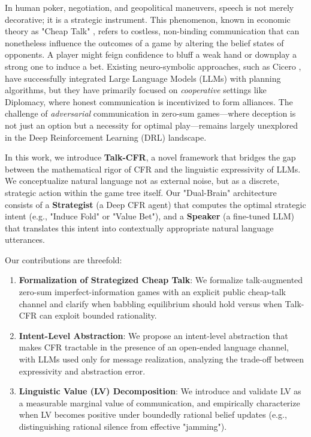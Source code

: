 \documentclass{article}
\begin{document}
In human poker, negotiation, and geopolitical maneuvers, speech is not merely decorative; it is a strategic instrument. This phenomenon, known in economic theory as "Cheap Talk" \citep{crawford1982strategic}, refers to costless, non-binding communication that can nonetheless influence the outcomes of a game by altering the belief states of opponents. A player might feign confidence to bluff a weak hand or downplay a strong one to induce a bet. Existing neuro-symbolic approaches, such as Cicero \citep{bakhtin2022mastering}, have successfully integrated Large Language Models (LLMs) with planning algorithms, but they have primarily focused on \textit{cooperative} settings like Diplomacy, where honest communication is incentivized to form alliances. The challenge of \textit{adversarial} communication in zero-sum games—where deception is not just an option but a necessity for optimal play—remains largely unexplored in the Deep Reinforcement Learning (DRL) landscape.

In this work, we introduce \textbf{Talk-CFR}, a novel framework that bridges the gap between the mathematical rigor of CFR and the linguistic expressivity of LLMs. We conceptualize natural language not as external noise, but as a discrete, strategic action within the game tree itself. Our "Dual-Brain" architecture consists of a \textbf{Strategist} (a Deep CFR agent) that computes the optimal strategic intent (e.g., "Induce Fold" or "Value Bet"), and a \textbf{Speaker} (a fine-tuned LLM) that translates this intent into contextually appropriate natural language utterances.

Our contributions are threefold:
\begin{enumerate}
    \item \textbf{Formalization of Strategized Cheap Talk}: We formalize talk-augmented zero-sum imperfect-information games with an explicit public cheap-talk channel and clarify when babbling equilibrium should hold versus when Talk-CFR can exploit bounded rationality.
    \item \textbf{Intent-Level Abstraction}: We propose an intent-level abstraction that makes CFR tractable in the presence of an open-ended language channel, with LLMs used only for message realization, analyzing the trade-off between expressivity and abstraction error.
    \item \textbf{Linguistic Value (LV) Decomposition}: We introduce and validate LV as a measurable marginal value of communication, and empirically characterize when LV becomes positive under boundedly rational belief updates (e.g., distinguishing rational silence from effective "jamming").
\end{enumerate}
\end{document}
